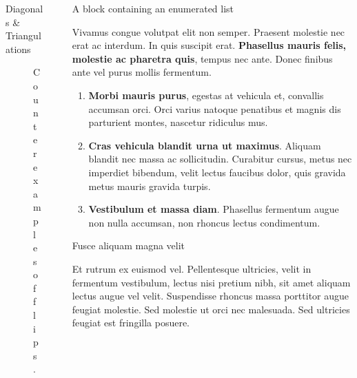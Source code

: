 \documentclass[final]{beamer}
\newlength{\sepwidth}
\newlength{\colwidth}
\newcommand{\separatorcolumn}{\begin{column}{\sepwidth}\end{column}}
\begin{document}
\begin{frame}[t]
\begin{columns}[t]
\begin{column}{\colwidth}
\begin{exampleblock}{Diagonals \& Triangulations}
\begin{figure}[H]
\begin{subfigure}[b]{.4\textwidth}
    \end{subfigure}
    \caption*{Counterexamples of \textcolor{gevodarkblue}{flips}.}
   \end{figure}
  \end{exampleblock}

\end{column}

\separatorcolumn

\begin{column}{\colwidth}

  \begin{block}{A block containing an enumerated list}

    Vivamus congue volutpat elit non semper. Praesent molestie nec erat ac
    interdum. In quis suscipit erat. \textbf{Phasellus mauris felis, molestie
    ac pharetra quis}, tempus nec ante. Donec finibus ante vel purus mollis
    fermentum. 

    \begin{enumerate}
      \item \textbf{Morbi mauris purus}, egestas at vehicula et, convallis
        accumsan orci. Orci varius natoque penatibus et magnis dis parturient
        montes, nascetur ridiculus mus.
      \item \textbf{Cras vehicula blandit urna ut maximus}. Aliquam blandit nec
        massa ac sollicitudin. Curabitur cursus, metus nec imperdiet bibendum,
        velit lectus faucibus dolor, quis gravida metus mauris gravida turpis.
      \item \textbf{Vestibulum et massa diam}. Phasellus fermentum augue non
        nulla accumsan, non rhoncus lectus condimentum.
    \end{enumerate}

  \end{block}

  \begin{block}{Fusce aliquam magna velit}

    Et rutrum ex euismod vel. Pellentesque ultricies, velit in fermentum
    vestibulum, lectus nisi pretium nibh, sit amet aliquam lectus augue vel
    velit. Suspendisse rhoncus massa porttitor augue feugiat molestie. Sed
    molestie ut orci nec malesuada. Sed ultricies feugiat est fringilla
    posuere.


\end{block}
\end{column}
\end{columns}
\end{frame}
\end{document}
